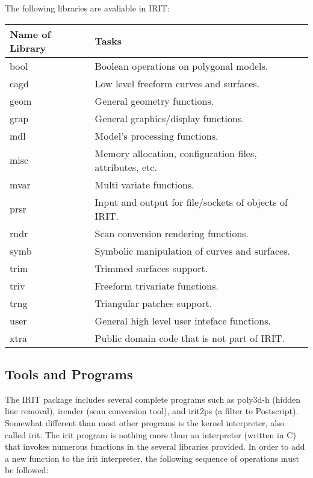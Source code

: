 The following libraries are avaliable in IRIT:
\begin{center}
\begin{tabular}{|l|l|} \hline
    Name of Library & Tasks \\ \hline
    bool & Boolean operations on polygonal models. \\
    cagd & Low level freeform curves and surfaces. \\
    geom & General geometry functions. \\
    grap & General graphics/display functions. \\
    mdl  & Model's processing functions. \\
    misc & Memory allocation, configuration files, attributes, etc. \\
    mvar & Multi variate functions. \\
    prsr & Input and output for file/sockets of objects of IRIT. \\
    rndr & Scan conversion rendering functions. \\
    symb & Symbolic manipulation of curves and surfaces. \\
    trim & Trimmed surfaces support. \\
    triv & Freeform trivariate functions. \\
    trng & Triangular patches support. \\
    user & General high level user inteface functions. \\
    xtra & Public domain code that is not part of IRIT. \\ \hline
\end{tabular}
\end{center}


\subsection{Tools and Programs}

The IRIT package includes several complete programs such as poly3d-h
(hidden line removal), irender (scan conversion tool), and irit2ps (a
filter to Postscript).  Somewhat different than most other programs is
the kernel interpreter, also called irit.  The irit program is nothing
more than an interpreter (written in C) that invokes numerous
functions in the several libraries provided.  In order to add a new
function to the irit interpreter, the following sequence of operations
must be followed:

